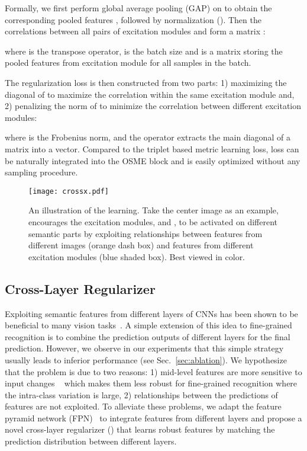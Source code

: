 \documentclass[10pt,twocolumn,letterpaper]{article}
\begin{document}
Formally, we first perform global average pooling (GAP) on  to obtain the corresponding pooled features , followed by  normalization (). Then the correlations between all pairs of excitation modules  and  form a matrix :

where  is the transpose operator,  is the batch size and  is a matrix storing the pooled features from excitation module  for all samples in the batch. 

The  regularization loss is then constructed from two parts: 1) maximizing the diagonal of  to maximize the correlation within the same excitation module and, 2) penalizing the norm of  to minimize the correlation between different excitation modules:

where  is the Frobenius norm, and the  operator extracts the main diagonal of a matrix into a vector. 
Compared to the triplet based metric learning loss,  loss can be naturally integrated into the OSME block and is easily optimized without any sampling procedure.

\begin{figure}[t]
\begin{center}
   \texttt{[image: crossx.pdf]}
\end{center}
   \caption{An illustration of the  learning. Take the center image as an example,  encourages the excitation modules,  and , to be activated on different semantic parts by exploiting relationships between features from different images (orange dash box) and features from different excitation modules (blue shaded box). Best viewed in color.}
\label{fig:c3s}
\end{figure}



\subsection{Cross-Layer Regularizer}
\label{sec:clr}
Exploiting  semantic features from different layers of CNNs has been shown to be beneficial to many vision tasks~\cite{fcn15darrell,hypercolumn15girshick,hypernet16kong,ssd16szegedy,mscnn16cai}. A simple extension of this idea to fine-grained recognition is to combine the prediction outputs of different layers for the final prediction.
However, we observe in our experiments that this simple strategy usually leads to inferior performance (see Sec.~\ref{sec:ablation}). 
We hypothesize that the problem is due to two reasons: 1) mid-level features are more sensitive to input changes ~\cite{understanding_CNNs14lecun} which makes them less robust for fine-grained recognition where the intra-class variation is large,
2) relationships between the predictions of  features are not exploited.
To alleviate these problems, we adapt the feature pyramid network (FPN)~\cite{fpn17kaiming} to integrate features from different layers and propose a novel cross-layer regularizer () that learns robust  features by matching the prediction distribution between different layers.
\end{document}
